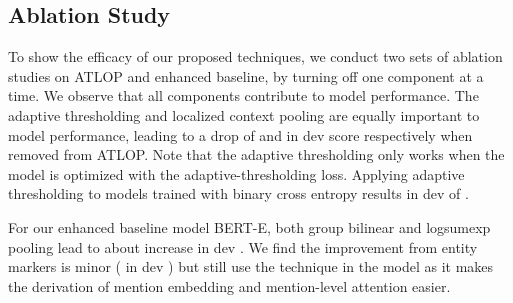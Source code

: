 \documentclass[letterpaper]{article}
\begin{document}
\begin{table}[!t]
\centering
{}
    \caption{Ablation study of ATLOP on DocRED. We turn off different components of the model one at a time. 
    These ablation results show that both adaptive thresholding and localized context pooling are effective. Logsumexp pooling and group bilinear both bring noticeable gain to the baseline.
    }
    \label{tab::ablation}
\end{table}

\subsection{Ablation Study}
To show the efficacy of our proposed techniques, we conduct two sets of ablation studies on ATLOP and enhanced baseline, by turning off one component at a time.
We observe that all components contribute to model performance.
The adaptive thresholding and localized context pooling are equally important to model performance, leading to a drop of  and  in dev  score respectively when removed from ATLOP.
Note that the adaptive thresholding only works when the model is optimized with the adaptive-thresholding loss.
Applying adaptive thresholding to models trained with binary cross entropy results in dev  of . 

For our enhanced baseline model BERT-E, both group bilinear and logsumexp pooling lead to about  increase in dev .
We find the improvement from entity markers is minor ( in dev ) but still use the technique in the model as it makes the derivation of mention embedding and mention-level attention easier.
\end{document}
